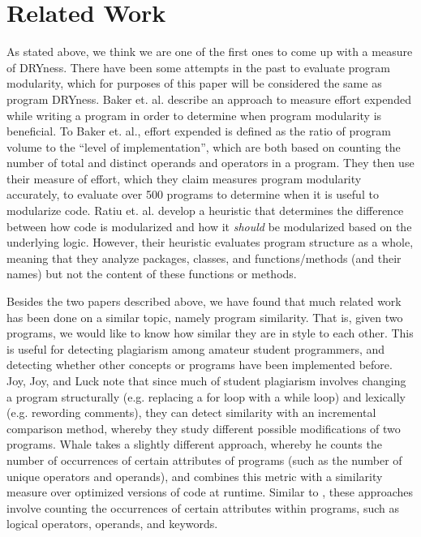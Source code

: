 \documentclass{article}
\begin{document}
\section{Related Work} As stated above, we think we are one of the first ones to come up with a measure of DRYness. There have been
some attempts in the past to evaluate program modularity, which for purposes of this paper will be considered the same as program DRYness.
Baker et. al.\cite{Modularity1979} describe an approach to measure effort expended while writing a program in order
to determine when program modularity is beneficial. To Baker et. al., effort expended is defined as the ratio of program volume to 
the ``level of implementation'', which are both based on counting the number of total and distinct operands and operators in a program.
They then use their measure of effort, which they claim measures program modularity accurately, to evaluate over 500 programs to
determine when it is useful to modularize code. Ratiu et. al.\cite{LogicalModularity} develop a heuristic that determines the 
difference between how code is modularized and how it \textit{should} be modularized based on the underlying logic. However, their heuristic
evaluates program structure as a whole, meaning that they analyze packages, classes, and functions/methods (and their names) but not the 
content of these functions or methods.

Besides the two papers described above, we have found that much related work has been done on a similar topic, namely
 program similarity. That is, given two programs, we would like to know how similar they are in style to each other.
This is useful for detecting plagiarism among amateur student programmers, and detecting whether other concepts or programs
have been implemented before. Joy, Joy, and Luck \cite{PlagiarismProgrammingAssignments} note that since much of student plagiarism involves changing a program structurally (e.g. replacing a for loop with a while loop) and lexically (e.g. rewording comments), they can
detect similarity with an incremental comparison method, whereby they study different possible modifications of two programs.
Whale \cite{ProgramSimilarityPopulations} takes a slightly different approach, whereby he counts the number of occurrences of certain attributes of programs (such as the number of unique operators and operands), and combines this metric with a similarity measure over optimized versions of code at runtime. Similar to \cite{Modularity1979}, these approaches involve counting the occurrences of certain attributes within programs, such as logical operators, operands, and keywords.
\end{document}
